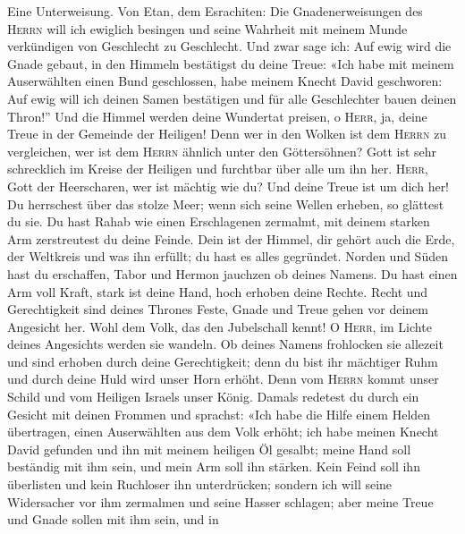  Eine Unterweisung. Von Etan, dem Esrachiten: Die
Gnadenerweisungen des \textsc{Herrn} will ich ewiglich besingen und
seine Wahrheit mit meinem Munde verkündigen von Geschlecht zu
Geschlecht.  Und zwar sage ich: Auf ewig wird die Gnade
gebaut, in den Himmeln bestätigst du deine Treue:  «Ich
habe mit meinem Auserwählten einen Bund geschlossen, habe meinem Knecht
David geschworen:  Auf ewig will ich deinen Samen
bestätigen und für alle Geschlechter bauen deinen Thron!''
 Und die Himmel werden deine Wundertat preisen, o
\textsc{Herr}, ja, deine Treue in der Gemeinde der Heiligen!
 Denn wer in den Wolken ist dem \textsc{Herrn} zu
vergleichen, wer ist dem \textsc{Herrn} ähnlich unter den Göttersöhnen?
 Gott ist sehr schrecklich im Kreise der Heiligen und
furchtbar über alle um ihn her.  \textsc{Herr}, Gott der
Heerscharen, wer ist mächtig wie du? Und deine Treue ist um dich her!
 Du herrschest über das stolze Meer; wenn sich seine
Wellen erheben, so glättest du sie.  Du hast Rahab wie
einen Erschlagenen zermalmt, mit deinem starken Arm zerstreutest du
deine Feinde.  Dein ist der Himmel, dir gehört auch die
Erde, der Weltkreis und was ihn erfüllt; du hast es alles gegründet.
 Norden und Süden hast du erschaffen, Tabor und Hermon
jauchzen ob deines Namens.  Du hast einen Arm voll Kraft,
stark ist deine Hand, hoch erhoben deine Rechte.  Recht
und Gerechtigkeit sind deines Thrones Feste, Gnade und Treue gehen vor
deinem Angesicht her.  Wohl dem Volk, das den Jubelschall
kennt! O \textsc{Herr}, im Lichte deines Angesichts werden sie wandeln.
 Ob deines Namens frohlocken sie allezeit und sind
erhoben durch deine Gerechtigkeit;  denn du bist ihr
mächtiger Ruhm und durch deine Huld wird unser Horn erhöht.
 Denn vom \textsc{Herrn} kommt unser Schild und vom
Heiligen Israels unser König.  Damals redetest du durch
ein Gesicht mit deinen Frommen und sprachst: «Ich habe die Hilfe einem
Helden übertragen, einen Auserwählten aus dem Volk erhöht;
 ich habe meinen Knecht David gefunden und ihn mit meinem
heiligen Öl gesalbt;  meine Hand soll beständig mit ihm
sein, und mein Arm soll ihn stärken.  Kein Feind soll ihn
überlisten und kein Ruchloser ihn unterdrücken;  sondern
ich will seine Widersacher vor ihm zermalmen und seine Hasser schlagen;
 aber meine Treue und Gnade sollen mit ihm sein, und in
